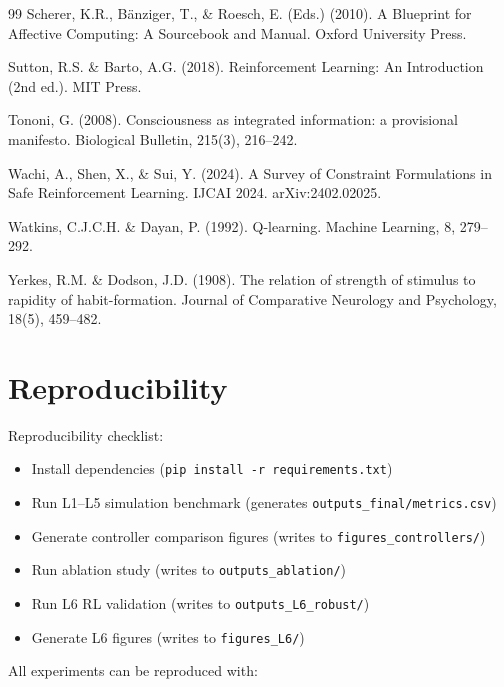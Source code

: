 \documentclass{article}
\begin{document}
\begin{thebibliography}{99}
Scherer, K.R., B\"anziger, T., \& Roesch, E. (Eds.) (2010). A Blueprint for Affective Computing: A Sourcebook and Manual. Oxford University Press.

Sutton, R.S. \& Barto, A.G. (2018). Reinforcement Learning: An Introduction (2nd ed.). MIT Press.

Tononi, G. (2008). Consciousness as integrated information: a provisional manifesto. Biological Bulletin, 215(3), 216--242.

Wachi, A., Shen, X., \& Sui, Y. (2024). A Survey of Constraint Formulations in Safe Reinforcement Learning. IJCAI 2024. arXiv:2402.02025.

Watkins, C.J.C.H. \& Dayan, P. (1992). Q-learning. Machine Learning, 8, 279--292.

Yerkes, R.M. \& Dodson, J.D. (1908). The relation of strength of stimulus to rapidity of habit-formation. Journal of Comparative Neurology and Psychology, 18(5), 459--482.

\end{thebibliography}

\appendix

\section{Reproducibility}

Reproducibility checklist:
\begin{itemize}
    \item Install dependencies (\texttt{pip install -r requirements.txt})
    \item Run L1--L5 simulation benchmark (generates \texttt{outputs\_final/metrics.csv})
    \item Generate controller comparison figures (writes to \texttt{figures\_controllers/})
    \item Run ablation study (writes to \texttt{outputs\_ablation/})
    \item Run L6 RL validation (writes to \texttt{outputs\_L6\_robust/})
    \item Generate L6 figures (writes to \texttt{figures\_L6/})
\end{itemize}

All experiments can be reproduced with:
\end{document}
